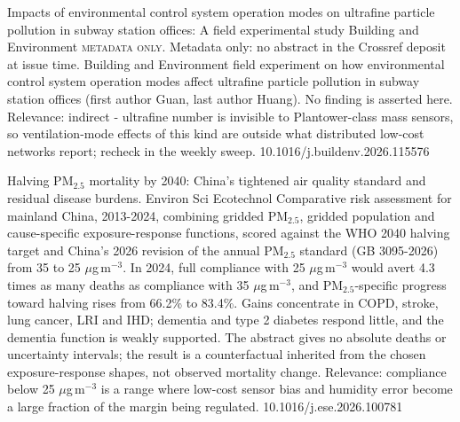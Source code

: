\documentclass[10pt]{article}
\begin{document}
\par{}\baselineskip{}\baselineskip
{}

{Impacts of environmental control system operation modes on ultrafine particle pollution in subway station offices: A field experimental study}
{Building and Environment}
{\textsc{metadata only.} Metadata only: no abstract in the Crossref deposit at issue time. Building and Environment field experiment on how environmental control system operation modes affect ultrafine particle pollution in subway station offices (first author Guan, last author Huang). No finding is asserted here. Relevance: indirect - ultrafine number is invisible to Plantower-class mass sensors, so ventilation-mode effects of this kind are outside what distributed low-cost networks report; recheck in the weekly sweep.}
{10.1016/j.buildenv.2026.115576}

\par{}\baselineskip{}\baselineskip
{}

{Halving PM$_{2.5}$ mortality by 2040: China's tightened air quality standard and residual disease burdens.}
{Environ Sci Ecotechnol}
{Comparative risk assessment for mainland China, 2013-2024, combining gridded PM$_{2.5}$, gridded population and cause-specific exposure-response functions, scored against the WHO 2040 halving target and China's 2026 revision of the annual PM$_{2.5}$ standard (GB 3095-2026) from 35 to 25 $\mu$g\,m$^{-3}$. In 2024, full compliance with 25 $\mu$g\,m$^{-3}$ would avert 4.3 times as many deaths as compliance with 35 $\mu$g\,m$^{-3}$, and PM$_{2.5}$-specific progress toward halving rises from 66.2\% to 83.4\%. Gains concentrate in COPD, stroke, lung cancer, LRI and IHD; dementia and type 2 diabetes respond little, and the dementia function is weakly supported. The abstract gives no absolute deaths or uncertainty intervals; the result is a counterfactual inherited from the chosen exposure-response shapes, not observed mortality change. Relevance: compliance below 25 $\mu$g\,m$^{-3}$ is a range where low-cost sensor bias and humidity error become a large fraction of the margin being regulated.}
{10.1016/j.ese.2026.100781}
\end{document}
